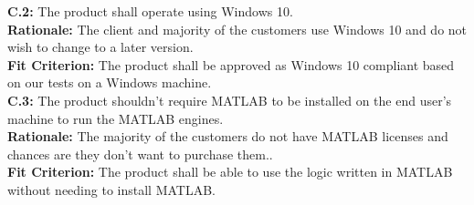\documentclass[12pt]{article}
\begin{document}
    \textbf{C.2:} The product shall operate using Windows 10. \\
    \textbf{Rationale:} The client and majority of the customers use Windows 10 and do not wish to change to a later version.\\
    \textbf{Fit Criterion:} The product shall be approved as Windows 10 compliant based on our tests on a Windows machine.\\

    \textbf{C.3:} The product shouldn't require MATLAB to be installed on the end user’s machine to run the MATLAB engines. \\
    \textbf{Rationale:} The majority of the customers do not have MATLAB licenses and chances are they don’t want to purchase them..\\
    \textbf{Fit Criterion:} The product shall be able to use the logic written in MATLAB without needing to install MATLAB.\\\\
\end{document}
